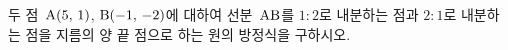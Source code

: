 두 점~$\mathrm{A}(5,\,1)$, $\mathrm{B}(-1,\,-2)$에 대하여 선분~$\mathrm{AB}$를 $1:2$로 내분하는 점과 $2:1$로 내분하는 점을 지름의 양 끝 점으로 하는 원의 방정식을 구하시오.
